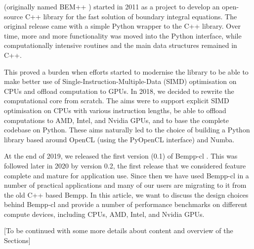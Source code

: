  (originally named BEM++ \cite{BEM++}) started in 2011 as a project to develop an open-source C++ library for the fast solution of boundary integral equations. The original release came with a simple Python wrapper to the C++ library. Over time, more and more functionality was moved into the Python interface, while computationally intensive routines and the main data structures remained in C++.

This proved a burden when efforts started to modernise the library to be able to make better use of Single-Instruction-Multiple-Data (SIMD) optimisation on CPUs and offload computation to GPUs. In 2018, we decided to rewrite the computational core from scratch. The aims were to support explicit SIMD optimisation on CPUs with various instruction lengths, be able to offload computations to AMD, Intel, and Nvidia GPUs, and to base the complete codebase on Python. These aims naturally led to the choice of building a Python library based around OpenCL (using the PyOpenCL interface) and Numba.

At the end of 2019, we released the first version (0.1) of Bempp-cl \cite{Bempp-cl}. This was followed later in 2020 by version 0.2, the first release that we considered feature complete and mature for application use. Since then we have used Bempp-cl in a number of practical applications and many of our users are migrating to it from the old C++ based Bempp. In this article, we want to discuss the design choices behind Bempp-cl and provide a number of performance benchmarks on different compute devices, including CPUs, AMD, Intel, and Nvidia GPUs.

[To be continued with some more details about content and overview of the Sections]
